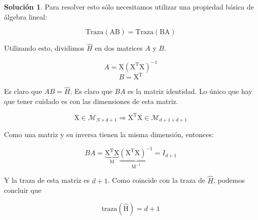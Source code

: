 \documentclass[a4paper, 11pt]{article}
\theoremstyle{definition}
\newtheorem*{solucion}{Solución}
\begin{document}
  \begin{solucion}
    Para resolver esto sólo necesitamos utilizar una propiedad básica de álgebra lineal:

    $$ \mathrm{Traza(AB)}=\mathrm{Traza(BA)}$$

    Utilizando esto, dividimos $\hat{H}$ en dos matrices $A$ y $B$.

    $$A = \mathrm{X(X^TX)^{-1}}$$
    $$B = \mathrm{X^T}$$

    Es claro que $AB=\hat{H}$. Es claro que $BA$ es la matriz identidad. Lo único que hay que tener cuidado es con las dimensiones de esta matriz.

    $$\mathrm{X} \in \mathcal{M}_{N \times d+1} \Rightarrow \mathrm{X^TX} \in \mathcal{M}_{d+1 \times d+1}$$

    Como una matriz y su inversa tienen la misma dimensión, entonces:

    $$BA=\mathrm{\underbrace{X^TX}_M\underbrace{(X^TX)^{-1}}_{M^{-1}}}=I_{d+1}$$

    Y la traza de esta matriz es $d+1$. Como coincide con la traza de $\hat{H}$, podemos concluir que

    $$\mathrm{traza(\hat{H})}=d+1$$
  \end{solucion}
\end{document}
